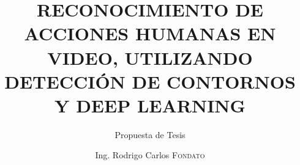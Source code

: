 \title{RECONOCIMIENTO DE ACCIONES HUMANAS EN VIDEO, UTILIZANDO DETECCIÓN DE CONTORNOS Y DEEP LEARNING}
\subtitle{Propuesta de Tesis}
\author{Ing. Rodrigo Carlos \textsc{Fondato}}
\date{\fecha}
\copyrightYear{\number\year}
